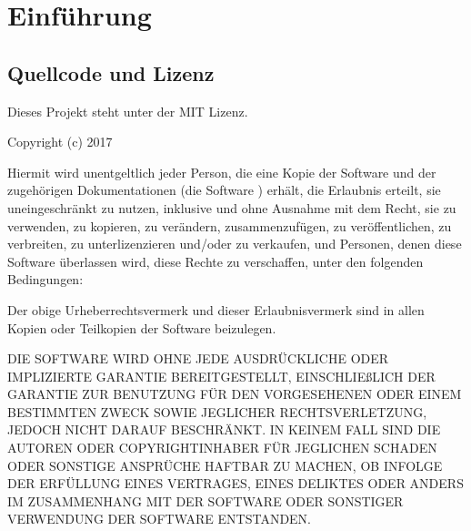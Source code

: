 \chapter{Einführung}
\label{cha:Einleitung}


\section{Quellcode und Lizenz}
\label{sec:licens_code}
Dieses Projekt steht unter der MIT Lizenz.

\vspace*{5mm} \noindent Copyright (c) 2017 \autor

\vspace*{5mm} \noindent Hiermit wird unentgeltlich jeder Person, die eine Kopie der Software und der zugehörigen Dokumentationen (die \glqq Software \grqq) erhält, die Erlaubnis erteilt, sie uneingeschränkt zu nutzen, inklusive und ohne Ausnahme mit dem Recht, sie zu verwenden, zu kopieren, zu verändern, zusammenzufügen, zu veröffentlichen, zu verbreiten, zu unterlizenzieren und/oder zu verkaufen, und Personen, denen diese Software überlassen wird, diese Rechte zu verschaffen, unter den folgenden Bedingungen:

\noindent Der obige Urheberrechtsvermerk und dieser Erlaubnisvermerk sind in allen Kopien oder Teilkopien der Software beizulegen.

\vspace*{5mm} \noindent DIE SOFTWARE WIRD OHNE JEDE AUSDRÜCKLICHE ODER IMPLIZIERTE GARANTIE BEREITGESTELLT, EINSCHLIEßLICH DER GARANTIE ZUR BENUTZUNG FÜR DEN VORGESEHENEN ODER EINEM BESTIMMTEN ZWECK SOWIE JEGLICHER RECHTSVERLETZUNG, JEDOCH NICHT DARAUF BESCHRÄNKT. IN KEINEM FALL SIND DIE AUTOREN ODER COPYRIGHTINHABER FÜR JEGLICHEN SCHADEN ODER SONSTIGE ANSPRÜCHE HAFTBAR ZU MACHEN, OB INFOLGE DER ERFÜLLUNG EINES VERTRAGES, EINES DELIKTES ODER ANDERS IM ZUSAMMENHANG MIT DER SOFTWARE ODER SONSTIGER VERWENDUNG DER SOFTWARE ENTSTANDEN.
